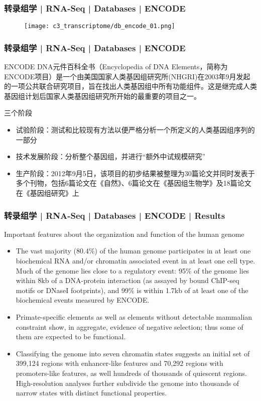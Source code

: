 \begin{frame}
  \frametitle{转录组学 | RNA-Seq | Databases | ENCODE}
  \begin{figure}
    \centering
    \texttt{[image: c3\_transcriptome/db\_encode\_01.png]}
  \end{figure}
\end{frame}

\begin{frame}
  \frametitle{转录组学 | RNA-Seq | Databases | ENCODE}
  \begin{block}{ENCODE}
 DNA元件百科全书（Encyclopedia of DNA Elements，简称为ENCODE项目）是一个由美国国家人类基因组研究所(NHGRI)在2003年9月发起的一项公共联合研究项目，旨在找出人类基因组中所有功能组件。这是继完成人类基因组计划后国家人类基因组研究所开始的最重要的项目之一。
  \end{block}
  \pause
  \begin{block}{三个阶段}
    \begin{itemize}
      \item 试验阶段：测试和比较现有方法以便严格分析一个所定义的人类基因组序列的一部分
      \item 技术发展阶段：分析整个基因组，并进行“额外中试规模研究”
      \item 生产阶段：2012年9月5日，该项目的初步结果被整理为30篇论文并同时发表于多个刊物，包括6篇论文在《自然》、6篇论文在《基因组生物学》及18篇论文在《基因组研究》上
    \end{itemize}
  \end{block}
\end{frame}

\begin{frame}
  \frametitle{转录组学 | RNA-Seq | Databases | ENCODE | Results}
  {\footnotesize
  \begin{block}{Important features about the organization and function of the human genome}
  \begin{itemize}
    \item The vast majority (80.4\%) of the human genome participates in at least one biochemical RNA and/or chromatin associated event in at least one cell type. Much of the genome lies close to a regulatory event: 95\% of the genome lies within 8kb of a DNA-protein interaction (as assayed by bound ChIP-seq motifs or DNaseI footprints), and 99\% is within 1.7kb of at least one of the biochemical events measured by ENCODE.
    \item Primate-specific elements as well as elements without detectable mammalian constraint show, in aggregate, evidence of negative selection; thus some of them are expected to be functional.
    \item Classifying the genome into seven chromatin states suggests an initial set of 399,124 regions with enhancer-like features and 70,292 regions with promoters-like features, as well hundreds of thousands of quiescent regions. High-resolution analyses further subdivide the genome into thousands of narrow states with distinct functional properties.
  \end{itemize}
  \end{block}
  }
\end{frame}

